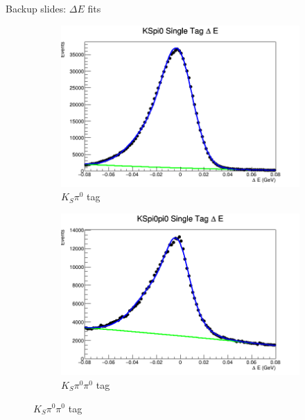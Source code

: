 \documentclass{beamer}
\begin{document}
\begin{frame}{Backup slides: $\Delta E$ fits}
  \begin{figure}
    \centering
    \vspace{-0.2cm}
    \begin{subfigure}{0.5\textwidth}
      \includegraphics[width = 1\textwidth]{KSpi0DeltaE.png}
      \caption{$K_S\pi^0$ tag}
    \end{subfigure}%
    \begin{subfigure}{0.5\textwidth}
      \includegraphics[width = 1\textwidth]{KSpi0pi0DeltaE.png}
      \caption{$K_S\pi^0\pi^0$ tag}
    \end{subfigure}
  \end{figure}
\end{frame}
\end{document}
